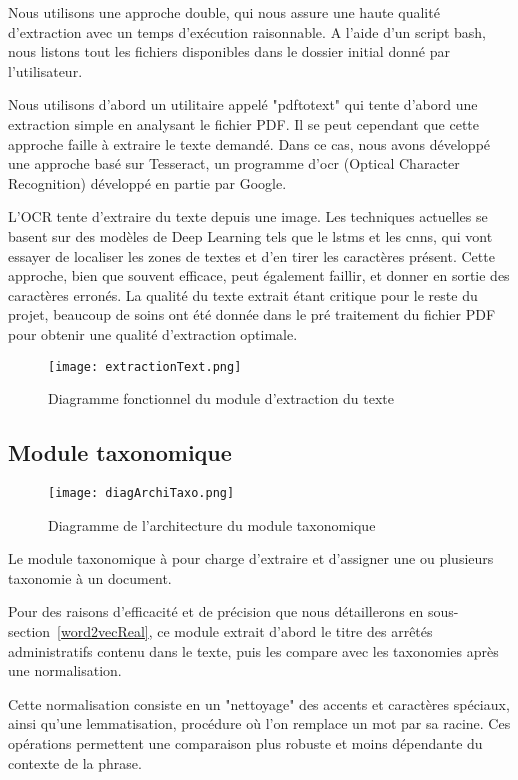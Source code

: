 Nous utilisons une approche double, qui nous assure une haute qualité d'extraction avec un temps d'exécution raisonnable.
A l'aide d'un script bash, nous listons tout les fichiers disponibles dans le dossier initial donné par l'utilisateur. 

Nous utilisons d'abord un utilitaire appelé "pdftotext" qui tente d'abord une extraction simple en analysant le fichier PDF\@.
Il se peut cependant que cette approche faille à extraire le texte demandé.
Dans ce cas, nous avons développé une approche basé sur Tesseract\cite{tess}, un programme d'\gls{ocr} (Optical Character Recognition) développé en partie par Google. 

L'OCR tente d'extraire du texte depuis une image. Les techniques actuelles se basent sur des modèles de Deep Learning tels que le \glspl{lstm} et les \glspl{cnn}, qui vont essayer de localiser les zones de textes et d'en tirer les caractères présent.
Cette approche, bien que souvent efficace, peut également faillir, et donner en sortie des caractères erronés.
La qualité du texte extrait étant critique pour le reste du projet, beaucoup de soins ont été donnée dans le pré traitement du fichier PDF pour obtenir une qualité d'extraction optimale.

\begin{figure}[h!]
  \centering
	\texttt{[image: extractionText.png]}
	\caption[]{Diagramme fonctionnel du module d'extraction du texte}
  \label{}
\end{figure}


\subsection{Module taxonomique}

\begin{figure}[h!]
  \centering
  \texttt{[image: diagArchiTaxo.png]}
	\caption[]{Diagramme de l'architecture du module taxonomique}
  \label{}
\end{figure}

Le module taxonomique à pour charge d'extraire et d'assigner une ou plusieurs taxonomie à un document.

Pour des raisons d'efficacité et de précision que nous détaillerons en sous-section~\ref{word2vecReal}, ce module extrait d'abord le titre des arrêtés administratifs contenu dans le texte, puis les compare avec les taxonomies après une normalisation.

Cette normalisation consiste en un "nettoyage" des accents et caractères spéciaux, ainsi qu'une lemmatisation, procédure où l'on remplace un mot par sa racine.
Ces opérations permettent une comparaison plus robuste et moins dépendante du contexte de la phrase. 

